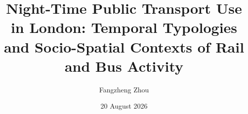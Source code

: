 

\makeatletter
\renewcommand {\@degree@string} {Master of Science}
\makeatother

\title{Night-Time Public Transport Use in London: Temporal Typologies and Socio-Spatial Contexts of Rail and Bus Activity}
\author{Fangzheng Zhou}
\date{20 August 2026}

